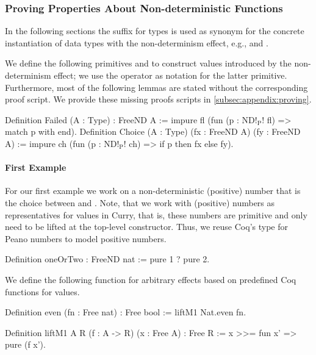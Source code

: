 \subsubsection{Proving Properties About Non\--deterministic Functions}
\label{subsubsec:nondetProving}

In the following sections the suffix  for types is used as synonym for the concrete instantiation of data types with the non\--determinism effect, e.g.,  and .

We define the following primitives  and  to construct values introduced by the non\--determinism effect; we use the operator  as notation for the latter primitive.
Furthermore, most of the following lemmas are stated without the corresponding proof script.
We provide these missing proofs scripts in \autoref{subsec:appendix:proving}.

\begin{coqcode}
Definition Failed (A : Type) : FreeND A :=
  impure fl (fun (p : ND!$_\text{P}$! fl) => match p with end).
Definition Choice (A : Type) (fx : FreeND A) (fy : FreeND A) :=
  impure ch (fun (p : ND!$_\text{P}$! ch) => if p then fx else fy).
\end{coqcode}

\paragraph{First Example}
\label{par:firstNDExample}
For our first example we work on a non\--deterministic (positive) number that is the choice between  and .
Note, that we work with (positive) numbers as representatives for  values in Curry, that is, these numbers are primitive and only need to be lifted at the top\--level constructor.
Thus, we reuse Coq's type for Peano numbers  to model positive numbers.

\begin{coqcode}
Definition oneOrTwo : FreeND nat :=
  pure 1 ? pure 2.
\end{coqcode}

We define the following function  for arbitrary effects based on predefined Coq functions for  values.

\begin{coqcode}
Definition even (fn : Free nat) : Free bool :=
  liftM1 Nat.even fn.

Definition liftM1 A R (f : A -> R) (x : Free A) : Free R :=
  x >>= fun x' => pure (f x').
\end{coqcode}

